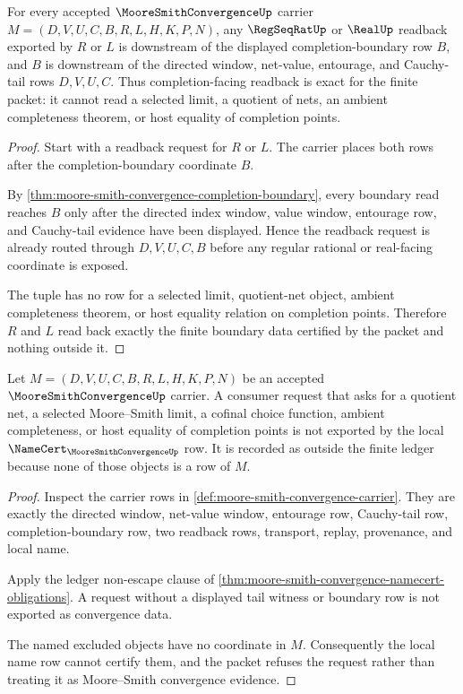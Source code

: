 \begin{theorem}
\label{thm:moore-smith-convergence-completion-readback-exactness}
For every accepted $\MooreSmithConvergenceUp$ carrier $M=(D,V,U,C,B,R,L,H,K,P,N)$, any $\RegSeqRatUp$ or $\RealUp$ readback exported by $R$ or $L$ is downstream of the displayed completion-boundary row $B$, and $B$ is downstream of the directed window, net-value, entourage, and Cauchy-tail rows $D,V,U,C$. Thus completion-facing readback is exact for the finite packet: it cannot read a selected limit, a quotient of nets, an ambient completeness theorem, or host equality of completion points.
\end{theorem}
\begin{proof}
Start with a readback request for $R$ or $L$. The carrier places both rows after the completion-boundary coordinate $B$.

By \autoref{thm:moore-smith-convergence-completion-boundary}, every boundary read reaches $B$ only after the directed index window, value window, entourage row, and Cauchy-tail evidence have been displayed. Hence the readback request is already routed through $D,V,U,C,B$ before any regular rational or real-facing coordinate is exposed.

The tuple has no row for a selected limit, quotient-net object, ambient completeness theorem, or host equality relation on completion points. Therefore $R$ and $L$ read back exactly the finite boundary data certified by the packet and nothing outside it.
\end{proof}

\begin{theorem}
\label{thm:moore-smith-convergence-ledger-refusal}
Let $M=(D,V,U,C,B,R,L,H,K,P,N)$ be an accepted $\MooreSmithConvergenceUp$ carrier. A consumer request that asks for a quotient net, a selected Moore--Smith limit, a cofinal choice function, ambient completeness, or host equality of completion points is not exported by the local $\NameCert_{\MooreSmithConvergenceUp}$ row. It is recorded as outside the finite ledger because none of those objects is a row of $M$.
\end{theorem}
\begin{proof}
Inspect the carrier rows in \autoref{def:moore-smith-convergence-carrier}. They are exactly the directed window, net-value window, entourage row, Cauchy-tail row, completion-boundary row, two readback rows, transport, replay, provenance, and local name.

Apply the ledger non-escape clause of \autoref{thm:moore-smith-convergence-namecert-obligations}. A request without a displayed tail witness or boundary row is not exported as convergence data.

The named excluded objects have no coordinate in $M$. Consequently the local name row cannot certify them, and the packet refuses the request rather than treating it as Moore--Smith convergence evidence.
\end{proof}

